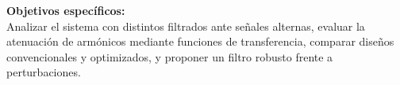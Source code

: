 \documentclass[12pt]{article}
\begin{document}
\begin{tcbposter}
{\begin{multicols}{2}
            \columnbreak

            \textbf{Objetivos específicos:} \\

            Analizar el sistema con distintos filtrados ante señales alternas, evaluar la atenuación de armónicos mediante funciones de transferencia, comparar diseños convencionales y optimizados, y proponer un filtro robusto frente a perturbaciones.
        \end{multicols}
    }







\end{tcbposter}
\end{document}
